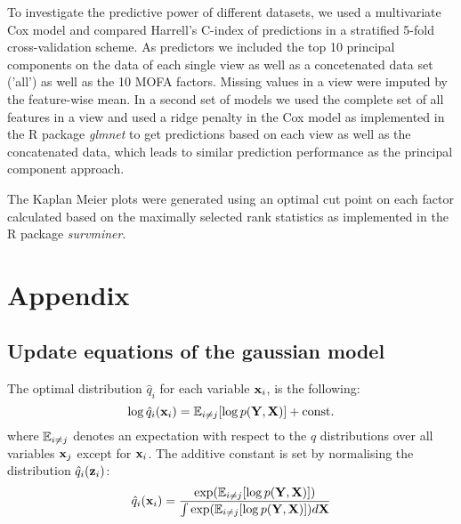 \documentclass[10pt, a4paper,openany]{report}
\begin{document}
To investigate the predictive power of different datasets, we used a multivariate Cox model and compared Harrell's C-index of predictions in a stratified 5-fold cross-validation scheme. As predictors we included the top 10 principal components on the data of each single view as well as a concetenated data set ('all') as well as the 10 MOFA factors. Missing values in a view were imputed by the feature-wise mean. In a second set of models we used the complete set of all features in a view and used a ridge penalty in the Cox model as implemented in the R package \textit{glmnet} to get predictions based on each view as well as the concatenated data, which leads to similar prediction performance as the principal component approach.

The Kaplan Meier plots were generated using an optimal cut point on each factor calculated based on the maximally selected rank statistics as implemented in the R package \textit{survminer}.

\newpage

\section{Appendix} \label{appendix}

\subsection{Update equations of the gaussian model}

The optimal distribution $\hat{q}_i$ for each variable ${\bf x}_i$, is the following:
\begin{equation} \label{eq:optimal_q_dist}
\log \hat{q}_i({\bf x}_i) = \mathbb{E}_{i \neq j} [\log p({\bf Y},{\bf X})] + {\rm const.}
\end{equation}
where $\mathbb{E}_{i \neq j}$ denotes an expectation with respect to the $q$ distributions over all variables ${\bf x}_j$ except for ${\bf x}_i$.
The additive constant is set by normalising the distribution $\hat{q}_i({\bf z}_i)$:
\[
\hat{q}_i({\bf x}_i) = \frac{\exp(\mathbb{E}_{i \neq j}[\log p({\bf Y},{\bf X})])}{\int \exp(\mathbb{E}_{i \neq j}[\log p({\bf Y},{\bf X})]) d{\bf X}}
\]
\end{document}
